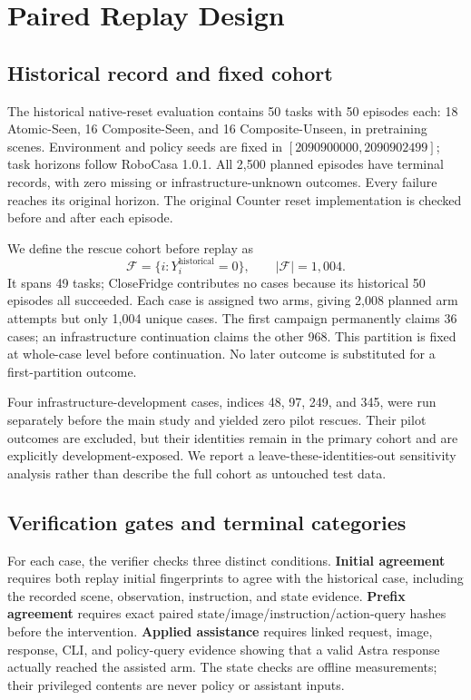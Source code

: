 \documentclass[10pt,twocolumn,letterpaper]{article}
\newcommand{\N}{1{,}004}
\newcommand{\F}{\mathcal F}
\begin{document}
\section{Paired Replay Design}
\label{sec:design}
\subsection{Historical record and fixed cohort}
The historical native-reset evaluation contains 50 tasks with 50 episodes each: 18 Atomic-Seen, 16 Composite-Seen, and 16 Composite-Unseen, in pretraining scenes. Environment and policy seeds are fixed in $[2090900000,2090902499]$; task horizons follow RoboCasa 1.0.1. All 2,500 planned episodes have terminal records, with zero missing or infrastructure-unknown outcomes. Every failure reaches its original horizon. The original Counter reset implementation is checked before and after each episode.

We define the rescue cohort before replay as
\begin{equation}
\F=\{i:Y_i^{\mathrm{historical}}=0\},\qquad |\F|=\N.
\end{equation}
It spans 49 tasks; CloseFridge contributes no cases because its historical 50 episodes all succeeded. Each case is assigned two arms, giving 2,008 planned arm attempts but only 1,004 unique cases. The first campaign permanently claims 36 cases; an infrastructure continuation claims the other 968. This partition is fixed at whole-case level before continuation. No later outcome is substituted for a first-partition outcome.

Four infrastructure-development cases, indices 48, 97, 249, and 345, were run separately before the main study and yielded zero pilot rescues. Their pilot outcomes are excluded, but their identities remain in the primary cohort and are explicitly development-exposed. We report a leave-these-identities-out sensitivity analysis rather than describe the full cohort as untouched test data.

\subsection{Verification gates and terminal categories}
\label{sec:gates}
For each case, the verifier checks three distinct conditions. \textbf{Initial agreement} requires both replay initial fingerprints to agree with the historical case, including the recorded scene, observation, instruction, and state evidence. \textbf{Prefix agreement} requires exact paired state/image/instruction/action-query hashes before the intervention. \textbf{Applied assistance} requires linked request, image, response, CLI, and policy-query evidence showing that a valid Astra response actually reached the assisted arm. The state checks are offline measurements; their privileged contents are never policy or assistant inputs.
\end{document}
